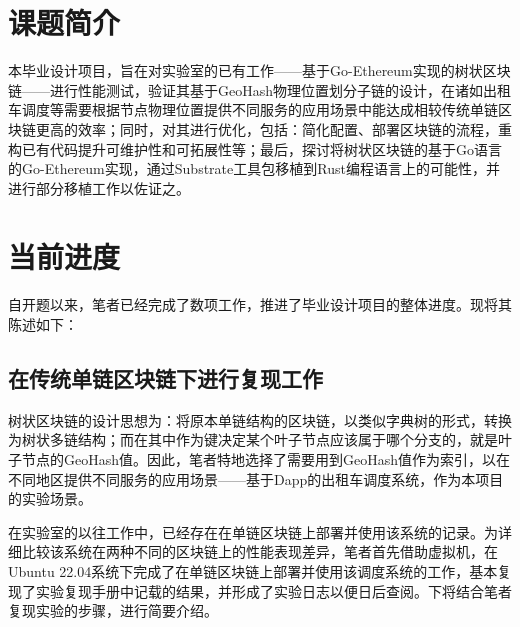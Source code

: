 %
%
%
%
%
%

\chapter{课题简介}

本毕业设计项目，旨在对实验室的已有工作——基于Go-Ethereum实现的树状区块链——进行性能测试，验证其基于GeoHash物理位置划分子链的设计，在诸如出租车调度等需要根据节点物理位置提供不同服务的应用场景中能达成相较传统单链区块链更高的效率；同时，对其进行优化，包括：简化配置、部署区块链的流程，重构已有代码提升可维护性和可拓展性等；最后，探讨将树状区块链的基于Go语言的Go-Ethereum实现，通过Substrate工具包移植到Rust编程语言上的可能性，并进行部分移植工作以佐证之。

\chapter{当前进度}

自开题以来，笔者已经完成了数项工作，推进了毕业设计项目的整体进度。现将其陈述如下：

\section{在传统单链区块链下进行复现工作}

树状区块链的设计思想为：将原本单链结构的区块链，以类似字典树的形式，转换为树状多链结构；而在其中作为键决定某个叶子节点应该属于哪个分支的，就是叶子节点的GeoHash值。因此，笔者特地选择了需要用到GeoHash值作为索引，以在不同地区提供不同服务的应用场景——基于Dapp的出租车调度系统，作为本项目的实验场景。

在实验室的以往工作中，已经存在在单链区块链上部署并使用该系统的记录。为详细比较该系统在两种不同的区块链上的性能表现差异，笔者首先借助虚拟机，在Ubuntu 22.04系统下完成了在单链区块链上部署并使用该调度系统的工作，基本复现了实验复现手册中记载的结果，并形成了实验日志以便日后查阅。下将结合笔者复现实验的步骤，进行简要介绍。


